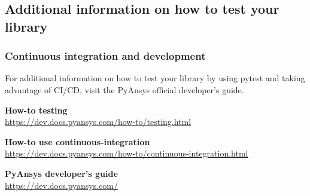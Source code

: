 \documentclass[t]{beamer}
\begin{document}
\subsection{Additional information on how to test your library}
\begin{frame}[fragile=singleslide]
  \frametitle{Continuous integration and development}

        For additional information on how to test your library by using pytest
        and taking advantage of CI/CD, visit the PyAnsys official developer's
        guide.

        \vspace{1em}
        \centering

        \vspace{1em}
        \textbf{How-to testing}
        \\\href{https://dev.docs.pyansys.com/how-to/testing.html}{https://dev.docs.pyansys.com/how-to/testing.html}

        \vspace{1em}
        \textbf{How-to use continuous-integration}
        \\\href{https://dev.docs.pyansys.com/how-to/continuous-integration.html}{https://dev.docs.pyansys.com/how-to/continuous-integration.html}

        \vspace{1em}
        \textbf{PyAnsys developer's guide}
        \\\href{https://dev.docs.pyansys.com/}{https://dev.docs.pyansys.com/}

\end{frame}


\lastframe{}
\end{document}
